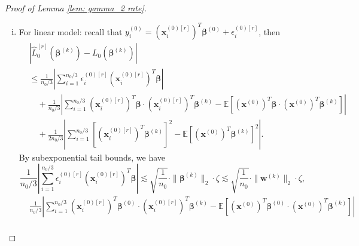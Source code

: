 \documentclass[12pt]{article}
\newcommand{\te}{\mathbb{E}}
\newcommand{\twonorm}[1]{\|#1\|_{2}}
\newcommand{\norma}[1]{\left|#1\right|}
\newcommand{\bbeta}{\bm{\beta}}
\newcommand{\bbetak}[1]{\bm{\beta}^{(#1)}}
\newcommand{\bx}{\bm{x}}
\newcommand{\bxk}[1]{\bm{x}^{(#1)}}
\newcommand{\bwk}[1]{\bm{w}^{(#1)}}
\newcommand{\<}{\langle}
\renewcommand{\>}{\rangle}
\begin{document}
\begin{proof}[Proof of Lemma \ref{lem: gamma_2 rate}]
\begin{enumerate}[(i)]
\begin{equation}
			\frac{1}{n_0/3}\norma{\sum_{i=1}^{n_0/3}\left[\psi'(\bbeta^T\bx_i^{(0)[r]})(\bbetak{k})^T\bx_i^{(0)[r]} - \te[\psi'(\bbeta^T\bxk{0})(\bbetak{k})^T\bxk{0}]\right]} \lesssim \sqrt{\frac{1}{n_0}}\twonorm{\bwk{k}}\cdot \zeta,
		\end{equation}
		with probability at least $1-\exp\{-\zeta^2\}$.
		For the last term, consider $g(u_1^{[r]}, \ldots, u_{n_0/3}^{[r]}) = \sum_{i=1}^{n_0/3}\psi(u_i^{[r]})$, where $u_i^{[r]} = (\bx_i^{(0)[r]})^T\bbetak{k}$ is an i.i.d. $\twonorm{\bbetak{k}}^2$-subGaussian. Since $\psi$ is 1-Lipschitz under $\ell_1$-norm, by Theorem 1 in \cite{kontorovich2014concentration} and union bounds,
		\begin{equation}\label{eq: prop 1 term 3}
			\frac{1}{n_0/3}\norma{\sum_{i=1}^{n_0/3} \left[\psi((\bbetak{k})^T\bx_i^{(0)[r]}) - \te\psi((\bbetak{k})^T\bx^{(0)}) \right]} \lesssim \sqrt{\frac{1}{n_0}}\cdot  \twonorm{\bwk{k}} \cdot \zeta,
		\end{equation}
		with probability at least $1-\exp\{-\zeta^2\}$.
		By \eqref{eq: prop 1 term 1}, \eqref{eq: prop 1 term 2} and \eqref{eq: prop 1 term 3}, the conclusion follows.
		\item For linear model: recall that $y_i^{(0)} = (\bx^{(0)[r]}_i)^T\bbetak{0} + \epsilon_i^{(0)[r]}$, then
		\begin{align}
			&\norma{\hat{L}_0^{[r]}(\bbetak{k}) - L_0(\bbetak{k})} \\
			&\leq \frac{1}{n_0/3}\norma{\sum_{i=1}^{n_0/3}\epsilon_i^{(0)[r]}(\bx^{(0)[r]}_i)^T\bbeta}\\
			&\quad + \frac{1}{n_0/3}\norma{\sum_{i=1}^{n_0/3}(\bx_i^{(0)[r]})^T\bbeta\cdot(\bx_i^{(0)[r]})^T\bbetak{k}-\te[(\bx^{(0)})^T\bbeta\cdot(\bx^{(0)})^T\bbetak{k}]} \\
			&\quad + \frac{1}{2n_0/3}\norma{\sum_{i=1}^{n_0/3}[(\bx_i^{(0)[r]})^T\bbetak{k}]^2 - \te[(\bx^{(0)})^T\bbetak{k}]^2}.
		\end{align}
		By subexponential tail bounds, we have
		\begin{equation}
			\frac{1}{n_0/3}\norma{\sum_{i=1}^{n_0/3}\epsilon_i^{(0)[r]}(\bx_i^{(0)[r]})^T\bbeta} \lesssim \sqrt{\frac{1}{n_0}}\cdot \twonorm{\bbetak{k}} \cdot \zeta \lesssim \sqrt{\frac{1}{n_0}}\cdot \twonorm{\bwk{k}} \cdot \zeta,
		\end{equation}
		\begin{align}
			 &\frac{1}{n_0/3}\norma{\sum_{i=1}^{n_0/3}(\bx^{(0)[r]}_i)^T\bbetak{0}\cdot(\bx^{(0)[r]}_i)^T\bbetak{k}-\te[(\bx^{(0)})^T\bbetak{0}\cdot(\bxk{0})^T\bbetak{k}]}\\

\end{align}
\end{enumerate}
\end{proof}
\end{document}
